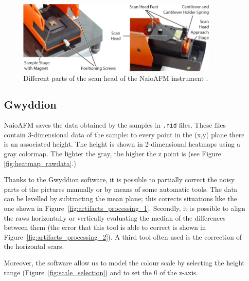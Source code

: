 \documentclass[11pt,a4paper]{article}
\begin{document}
\begin{figure}[hbt]
\centering
\includegraphics[width=0.9\textwidth]{naioafm2}
\caption{Different parts of the scan head of the NaioAFM instrument \cite{NaioAFM}.}
\label{fig:naioafm}
\end{figure}

\subsection{Gwyddion}

NaioAFM saves the data obtained by the samples in \texttt{.nid} files. These files contain 3-dimensional data of the sample: to every point in the (x,y) plane there is an associated height. The height is shown in 2-dimensional heatmaps using a gray colormap. The lighter the gray, the higher the z point is (see Figure \ref{fig:heatmap_rawdata}.)

Thanks to the Gwyddion software, it is possible to partially correct the noisy parts of the pictures manually or by means of some automatic tools. The data can be levelled by subtracting the mean plane; this corrects situations like the one shown in Figure~\ref{fig:artifacts_processing_1}. Secondly, it is possible to align the raws horizontally or vertically evaluating the median of the differences between them (the error that this tool is able to correct is shown in Figure~\ref{fig:artifacts_processing_2}). A third tool often used is the correction of the horizontal scars.

Moreover, the software allow us to model the colour scale by selecting the height range (Figure~\ref{fig:scale_selection}) and to set the 0 of the z-axis.
\end{document}
